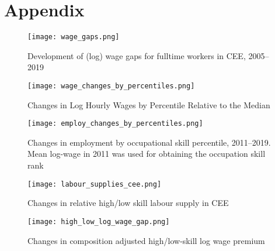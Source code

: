 \documentclass{article}
\begin{document}
\newpage

\section{Appendix}

\begin{figure}[!htbp]%
    \centering
    {\texttt{[image: wage\_gaps.png]} }
    \caption{Development of (log) wage gaps for fulltime workers in CEE, 2005–2019}
    \label{wage_gaps_CEE}
\end{figure}

\begin{figure}[!htbp]%
    \centering
    {\texttt{[image: wage\_changes\_by\_percentiles.png]} }
    \caption{Changes in Log Hourly Wages by Percentile Relative to the Median}
    \label{wage_changes_percentiles}
\end{figure}

\begin{figure}[!htbp]%
    \centering
    {\texttt{[image: employ\_changes\_by\_percentiles.png]} }
    \caption{Changes in employment by occupational skill percentile, 2011–2019. Mean log-wage in 2011 was used for obtaining the occupation skill rank}
    \label{employ_changes_percentiles}
\end{figure}

\begin{figure}[!htbp]%
        \centering 
        {\texttt{[image: labour\_supplies\_cee.png]}}
        \caption{Changes in relative high/low skill labour supply in CEE}
        \label{labour_supplies_cee}
\end{figure}

\begin{figure}[!htbp]%
    \centering 
    {\texttt{[image: high\_low\_log\_wage\_gap.png]}}
    \caption{Changes in composition adjusted high/low-skill log wage premium}
    \label{high_low_log_wage_gap}
\end{figure}
\end{document}
